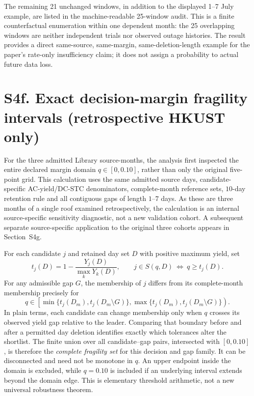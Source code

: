 \documentclass[11pt]{article}
\begin{document}
The remaining 21 unchanged windows, in addition to the displayed 1--7 July example, are listed in the machine-readable 25-window audit. This is a finite counterfactual enumeration within one dependent month: the 25 overlapping windows are neither independent trials nor observed outage histories. The result provides a direct same-source, same-margin, same-deletion-length example for the paper's rate-only insufficiency claim; it does not assign a probability to actual future data loss.

\section*{S4f. Exact decision-margin fragility intervals (retrospective HKUST only)}

For the three admitted Library source-months, the analysis first inspected the entire declared margin domain $q\in[0,0.10]$, rather than only the original five-point grid. This calculation uses the same admitted source days, candidate-specific AC-yield/DC-STC denominators, complete-month reference sets, $10$-day retention rule and all contiguous gaps of length $1$--$7$ days. As these are three months of a single roof examined retrospectively, the calculation is an internal source-specific sensitivity diagnostic, not a new validation cohort. A subsequent separate source-specific application to the original three cohorts appears in Section~S4g.

For each candidate $j$ and retained day set $D$ with positive maximum yield, set
\[
  t_j(D)=1-\frac{Y_j(D)}{\max_kY_k(D)},\qquad
  j\in S(q,D)\ \Longleftrightarrow\ q\ge t_j(D).
\]
For any admissible gap $G$, the membership of $j$ differs from its complete-month membership precisely for
\[
  q\in\left[\min\{t_j(D_m),t_j(D_m\setminus G)\},
  \max\{t_j(D_m),t_j(D_m\setminus G)\}\right).
\]
In plain terms, each candidate can change membership only when $q$ crosses its observed yield gap relative to the leader. Comparing that boundary before and after a permitted day deletion identifies exactly which tolerances alter the shortlist. The finite union over all candidate--gap pairs, intersected with $[0,0.10]$, is therefore the \emph{complete fragility set} for this decision and gap family. It can be disconnected and need not be monotone in $q$. An upper endpoint inside the domain is excluded, while $q=0.10$ is included if an underlying interval extends beyond the domain edge. This is elementary threshold arithmetic, not a new universal robustness theorem.
\end{document}
